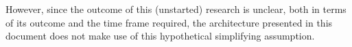 However, since the outcome of this (unstarted) research is unclear, both in terms of its outcome and the time frame required, the architecture presented in this document does not make use of this hypothetical simplifying assumption.

